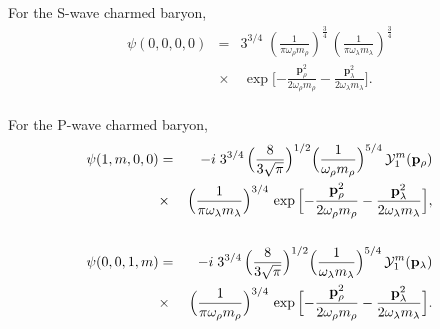 \documentclass[twocolumn,superscriptaddress,preprintnumbers,nofootinbib]{revtex4}
\begin{document}
For the S-wave charmed baryon,
\begin{eqnarray}
\psi(0,0,0,0)&=&3^{3/4}\;(\frac{1}{\pi
\omega_{\rho}m_{\rho}})^{\frac{3}{4}}\,(\frac{1}{\pi
\omega_{\lambda}m_{\lambda}})^{\frac{3}{4}}\nonumber \\ &\times&\,\exp\Big[{-\frac{
{\mathbf{p}}^2_{\rho}}{2\omega_{\rho}m_{\rho}} -\frac{
{\mathbf{p}}^2_{\lambda}}{2\omega_{\lambda}m_{\lambda}}}\Big].\nonumber\\&&
\end{eqnarray}

For the P-wave charmed baryon,
\begin{eqnarray}
\psi(1,m,0,0)&=&-i\;3^{3/4}\,\Big(\frac{8}{3\sqrt{\pi}}\Big)^{{1}/{2}}\Big(\frac{1}{
\omega_{\rho}m_{\rho}}\Big)^{ {5}/{4}}\,{\cal
Y}^m_1({\mathbf{p}}_{\rho})\nonumber\\&\times&\Big(\frac{1}{\pi
\omega_{\lambda}m_{\lambda}}\Big)^{{3}/{4}}\,\exp\Big[{-\frac{{\mathbf{p}}^2_{\rho}}{2\omega_{\rho}m_{\rho}}
-\frac{{\mathbf{p}}^2_{\lambda}}{2\omega_{\lambda}m_{\lambda}}}\Big],\nonumber\\&& \\
\psi(0,0,1,m)&=&-i\;3^{3/4}\,\Big(\frac{8}{3\sqrt{\pi}}\Big)^{{1}/{2}}\Big(\frac{1}{
\omega_{\lambda}m_{\lambda}}\Big)^{{5}/{4}}\,{\cal
Y}^m_1({\mathbf{p}}_{\lambda})\nonumber\\&\times& \Big(\frac{1}{\pi
\omega_{\rho}m_{\rho}}\Big)^{{3}/{4}}\,\exp\Big[{-\frac{{\mathbf{p}}^2_{\rho}}{2\omega_{\rho}m_{\rho}}
-\frac{{\mathbf{p}}^2_{\lambda}}{2\omega_{\lambda}m_{\lambda}}}\Big].\nonumber\\&&
\end{eqnarray}
\end{document}
